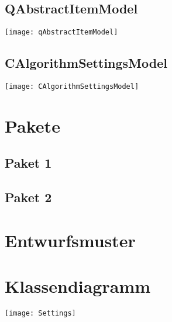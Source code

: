 \subsection{QAbstractItemModel}
\texttt{[image: qAbstractItemModel]}\\

\subsection{CAlgorithmSettingsModel}
\texttt{[image: CAlgorithmSettingsModel]}\\
\section{Pakete}
\subsection{Paket 1}
\subsection{Paket 2}
\section{Entwurfsmuster}

\section{Klassendiagramm}
\texttt{[image: Settings]}\\

